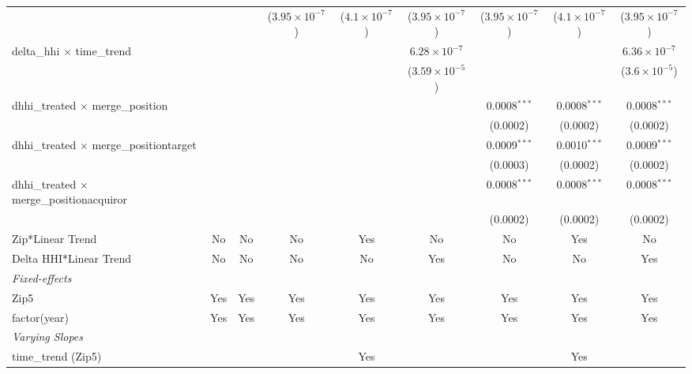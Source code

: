 \begin{table}[H]
{\begin{tabular}{lcccccccc}
   &   &    & ($3.95\times 10^{-7}$) & ($4.1\times 10^{-7}$) & ($3.95\times 10^{-7}$) & ($3.95\times 10^{-7}$) & ($4.1\times 10^{-7}$) & ($3.95\times 10^{-7}$)\\ 

 delta\_hhi $\times $ time\_trend&   &    &    &    & $6.28\times 10^{-7}$ &    &    & $6.36\times 10^{-7}$\\ 

   &   &    &    &    & ($3.59\times 10^{-5}$) &    &    & ($3.6\times 10^{-5}$)\\ 

 dhhi\_treated $\times $ merge\_position&   &    &    &    &    & 0.0008$^{***}$ & 0.0008$^{***}$ & 0.0008$^{***}$\\ 

   &   &    &    &    &    & (0.0002) & (0.0002) & (0.0002)\\ 

 dhhi\_treated $\times $ merge\_positiontarget&   &    &    &    &    & 0.0009$^{***}$ & 0.0010$^{***}$ & 0.0009$^{***}$\\ 

   &   &    &    &    &    & (0.0003) & (0.0002) & (0.0002)\\ 

 dhhi\_treated $\times $ merge\_positionacquiror&   &    &    &    &    & 0.0008$^{***}$ & 0.0008$^{***}$ & 0.0008$^{***}$\\ 

   &   &    &    &    &    & (0.0002) & (0.0002) & (0.0002)\\ 

 Zip*Linear Trend & No & No & No & Yes & No & No & Yes & No\\ 

 Delta HHI*Linear Trend & No & No & No & No & Yes & No & No & Yes\\ 

 \midrule \emph{Fixed-effects}&   &   &   &   &   &   &   &  \\ 

 Zip5 & Yes & Yes & Yes & Yes & Yes & Yes & Yes & Yes\\ 

 factor(year) & Yes & Yes & Yes & Yes & Yes & Yes & Yes & Yes\\ 

 \midrule \emph{Varying Slopes}&   &   &   &   &   &   &   &  \\ 

 time\_trend (Zip5) &  &  &  & Yes &  &  & Yes & \\ 


\end{tabular}}
\end{table}
